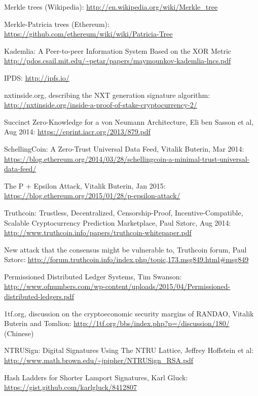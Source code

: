 \documentclass[11pt,a4paper]{article}
\theoremstyle{plain}
\theoremstyle{definition}
\theoremstyle{remark}
\begin{document}
\begin{thebibliography}{34}
    Merkle trees (Wikipedia): \url{http://en.wikipedia.org/wiki/Merkle_tree}

    Merkle-Patricia trees (Ethereum): \url{https://github.com/ethereum/wiki/wiki/Patricia-Tree}

    Kademlia: A Peer-to-peer Information System Based on the XOR Metric \url{http://pdos.csail.mit.edu/~petar/papers/maymounkov-kademlia-lncs.pdf}

    IPDS: \url{http://ipfs.io/}

    nxtinside.org, describing the NXT generation signature algorithm: \url{http://nxtinside.org/inside-a-proof-of-stake-cryptocurrency-2/}

    Succinct Zero-Knowledge for a von Neumann Architecture, Eli ben Sasson et al, Aug 2014: \url{https://eprint.iacr.org/2013/879.pdf}

    SchellingCoin: A Zero-Trust Universal Data Feed, Vitalik Buterin, Mar 2014: \url{https://blog.ethereum.org/2014/03/28/schellingcoin-a-minimal-trust-universal-data-feed/}

    The P + Epsilon Attack, Vitalik Buterin, Jan 2015: \url{https://blog.ethereum.org/2015/01/28/p-epsilon-attack/}

    Truthcoin: Trustless, Decentralized, Censorship-Proof, Incentive-Compatible, Scalable Cryptocurrency Prediction Marketplace, Paul Sztorc, Aug 2014: \url{http://www.truthcoin.info/papers/truthcoin-whitepaper.pdf}

    New attack that the consensus might be vulnerable to, Truthcoin forum, Paul Sztorc: \url{http://forum.truthcoin.info/index.php/topic,173.msg849.html#msg849}

    Permissioned Distributed Ledger Systems, Tim Swanson: \url{http://www.ofnumbers.com/wp-content/uploads/2015/04/Permissioned-distributed-ledgers.pdf}

    1tf.org, discussion on the cryptoeconomic security margins of RANDAO, Vitalik Buterin and Tomlion: \url{http://1tf.org/bbs/index.php?p=/discussion/180/} (Chinese)

    NTRUSign: Digital Signatures Using The NTRU Lattice, Jeffrey Hoffstein et al: \url{http://www.math.brown.edu/~jpipher/NTRUSign_RSA.pdf}

    Hash Ladders for Shorter Lamport Signatures, Karl Gluck: \url{https://gist.github.com/karlgluck/8412807}


\end{thebibliography}
\end{document}
